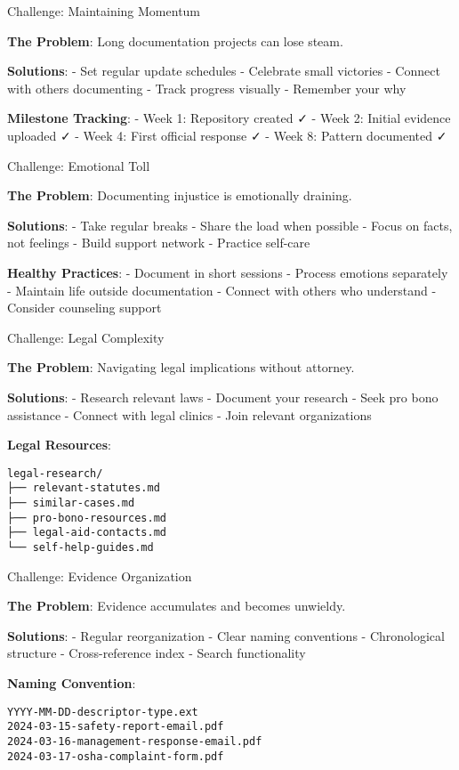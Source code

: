 Challenge: Maintaining Momentum

\textbf{The Problem}: Long documentation projects can lose steam.

\textbf{Solutions}: - Set regular update schedules - Celebrate small
victories - Connect with others documenting - Track progress visually -
Remember your why

\textbf{Milestone Tracking}: - Week 1: Repository created ✓ - Week 2:
Initial evidence uploaded ✓ - Week 4: First official response ✓ - Week
8: Pattern documented ✓

Challenge: Emotional Toll

\textbf{The Problem}: Documenting injustice is emotionally draining.

\textbf{Solutions}: - Take regular breaks - Share the load when possible
- Focus on facts, not feelings - Build support network - Practice
self-care

\textbf{Healthy Practices}: - Document in short sessions - Process
emotions separately - Maintain life outside documentation - Connect with
others who understand - Consider counseling support

Challenge: Legal Complexity

\textbf{The Problem}: Navigating legal implications without attorney.

\textbf{Solutions}: - Research relevant laws - Document your research -
Seek pro bono assistance - Connect with legal clinics - Join relevant
organizations

\textbf{Legal Resources}:

\begin{verbatim}
legal-research/
├── relevant-statutes.md
├── similar-cases.md
├── pro-bono-resources.md
├── legal-aid-contacts.md
└── self-help-guides.md
\end{verbatim}

Challenge: Evidence Organization

\textbf{The Problem}: Evidence accumulates and becomes unwieldy.

\textbf{Solutions}: - Regular reorganization - Clear naming conventions
- Chronological structure - Cross-reference index - Search functionality

\textbf{Naming Convention}:

\begin{verbatim}
YYYY-MM-DD-descriptor-type.ext
2024-03-15-safety-report-email.pdf
2024-03-16-management-response-email.pdf
2024-03-17-osha-complaint-form.pdf
\end{verbatim}

